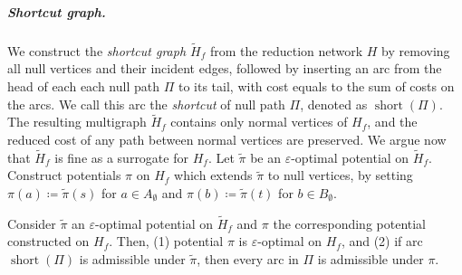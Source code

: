 \documentclass[a4paper,UKenglish]{socg-lipics-v2018}
\makeatletter
\def\note#1{\textcolor{red}{{#1}}}
\def\eps{\varepsilon}
\def\short{\operatorname{short}}
\theoremstyle{plain}
\numberwithin{figure}{section}
\renewcommand{\paragraph}{\subparagraph}
\def\EMPH#1{\textcolor{BrickRed}{{\emph{#1}}}}
\def\n@te#1{\textsf{\boldmath \textbf{$\langle\!\langle$#1$\rangle\!\rangle$}}\leavevmode}
\def\note#1{\textcolor{red}{\n@te{#1}}}
\makeatother
\begin{document}
\paragraph{Shortcut graph.}
We construct the \EMPH{shortcut graph $\tilde{H}_f$} from the reduction network $H$ by removing all
null vertices and their incident edges, followed by inserting an arc
from the head of each each null path $\Pi$ to its tail, with cost equals to the sum of costs on the arcs.
We call this arc the \EMPH{shortcut} of null path $\Pi$, denoted as \EMPH{$\short(\Pi)$}.
%
The resulting multigraph $\tilde{H}_f$ contains only normal vertices of $H_f$, and the reduced cost of any path between normal vertices are preserved.
%
We argue now that $\tilde{H}_f$ is fine as a surrogate for $H_f$.
%
Let $\tilde{\pi}$ be an $\eps$-optimal potential on $\tilde{H}_f$.
Construct potentials $\pi$ on $H_f$ which extends $\tilde{\pi}$ to null vertices, by
setting $\pi(a) \coloneqq \tilde{\pi}(s)$ for $a \in A_\emptyset$ and
$\pi(b) \coloneqq \tilde{\pi}(t)$ for $b \in B_\emptyset$.

\begin{lemmarep}
\label{lemma:empty_correct}
Consider $\tilde{\pi}$ an $\eps$-optimal potential on $\tilde{H}_f$ and $\pi$ the corresponding potential constructed on $H_f$.
Then,
(1) potential $\pi$ is $\eps$-optimal on  $H_f$, and
(2) if arc $\short(\Pi)$ is admissible under $\tilde{\pi}$, then every arc in $\Pi$ is admissible under $\pi$.
\end{lemmarep}
\end{document}
